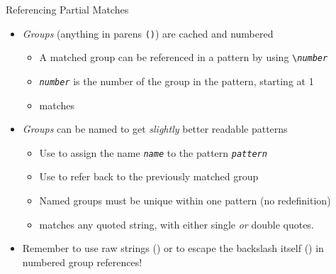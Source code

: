\begin{frame}{Referencing Partial Matches}
%
\begin{itemize}
\item \emph{Groups} (anything in parens \texttt{()}) are cached and numbered
	\begin{itemize}
	\item A matched group can be referenced in a pattern by using \texttt{\textbackslash\textit{number}}
	\item \texttt{\textit{number}} is the number of the group in the pattern, starting at 1
	\item[\Thus]  matches 
	\end{itemize}
\pause
\item \emph{Groups} can be named to get \emph{slightly} better readable patterns
	\begin{itemize}
	\item Use  to assign the name \texttt{\textit{name}} to the pattern \texttt{\textit{pattern}}
	\item Use  to refer back to the previously matched group
	\item Named groups must be unique within one pattern (no redefinition)
	\item[\Thus]  matches any quoted string, with either single \emph{or} double quotes.
	\end{itemize}
\pause
\item Remember to use raw strings () or to escape the backslash itself () in numbered group references!
\end{itemize}
%
\end{frame}



